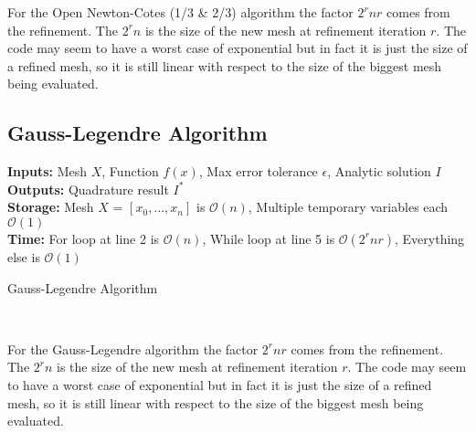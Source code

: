 \documentclass[12pt]{article}
\theoremstyle{remark}
\begin{document}
For the Open Newton-Cotes (1/3 \& 2/3) algorithm the factor $2^rnr$ comes from the refinement. The $2^rn$ is the size of the new mesh at refinement iteration $r$. The code may seem to have a worst case of exponential but in fact it is just the size of a refined mesh, so it is still linear with respect to the size of the biggest mesh being evaluated.

\newpage

\subsection{Gauss-Legendre Algorithm}

\textbf{Inputs:} Mesh $X$, Function $f(x)$, Max error tolerance $\epsilon$, Analytic solution $I$ \\
\textbf{Outputs:} Quadrature result $I^*$ \\
\textbf{Storage:} Mesh $X$ = $[x_0, \dots, x_n]$ is $\mathcal{O}(n)$, Multiple temporary variables each $\mathcal{O}(1)$ \\
\textbf{Time:} For loop at line 2 is $\mathcal{O}(n)$, While loop at line 5 is $\mathcal{O}(2^rnr)$, Everything else is $\mathcal{O}(1)$

\begin{algorithm}[H]
	\caption{Gauss-Legendre Algorithm}
	\begin{algorithmic}[1]
		\EndFor
		\EndFor
		\EndWhile
		 \\
	\end{algorithmic}
\end{algorithm}

For the Gauss-Legendre algorithm the factor $2^rnr$ comes from the refinement. The $2^rn$ is the size of the new mesh at refinement iteration $r$. The code may seem to have a worst case of exponential but in fact it is just the size of a refined mesh, so it is still linear with respect to the size of the biggest mesh being evaluated.
\end{document}
